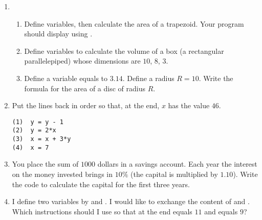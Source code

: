 \documentclass[11pt,class=report,crop=false]{standalone}
\begin{document}

\begin{activite}[Variables]


\begin{enumerate}
  \item 
  \begin{enumerate}
    \item Define variables, then calculate the area of a trapezoid. 
  Your program should display  using .


    
    \item Define variables to calculate the volume of a box (a rectangular parallelepiped) whose dimensions are $10$, $8$, $3$.
    
    \item Define a variable  equals to $3.14$. Define a radius $R = 10$. Write the formula for the area of a disc of radius $R$.

\end{enumerate}    

  
  \item Put the lines back in order so that, at the end, $x$ has the value $46$.
\begin{center}
\begin{minipage}{0.5\textwidth}
\begin{lstlisting}  
(1)  y = y - 1
(2)  y = 2*x
(3)  x = x + 3*y     
(4)  x = 7
\end{lstlisting}
\end{minipage}
\end{center}  
  
  \item You place the sum of $1000$ dollars in a savings account. Each year the interest on the money invested brings in $10\%$ (the capital is multiplied by $1.10$).
  Write the code to calculate the capital for the first three years.

  \item I define two variables by  and . I would like to exchange the content of  and . Which instructions should I use so that at the end  equals $11$ and  equals $9$?
  

\end{enumerate}
\end{activite}
\end{document}
